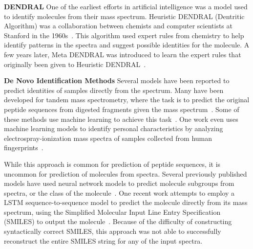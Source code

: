 \textbf{DENDRAL} One of the earliest efforts in artificial intelligence was a model used to identify molecules from their mass spectrum. Heuristic DENDRAL (Dentritic Algorithm) was a collaboration between chemists and computer scientists at Stanford in the 1960s~\cite{buchanan1981dendral}. This algorithm used expert rules from chemistry to help identify patterns in the spectra and suggest possible identities for the molecule. A few years later, Meta DENDRAL was introduced to learn the expert rules that originally been given to Heuristic DENDRAL~\cite{lindsay1993dendral}.

\textbf{De Novo Identification Methods} Several models have been reported to predict identities of samples directly from the spectrum. Many have been developed for tandem mass spectrometry, where the task is to predict the original peptide sequences from digested fragments given the mass spectrum~\cite{Eng1994sequest}. Some of these methods use machine learning to achieve this task~\cite{Tran8247deepnovo, Schoenholtz2018supervision}. One work even uses machine learning models to identify personal characteristics by analyzing electrospray-ionization mass spectra of samples collected from human fingerprints~\cite{Zhou2017LatentFingerprints}.

While this approach is common for prediction of peptide sequences, it is uncommon for prediction of molecules from spectra. Several previously published models have used neural network models to predict molecule subgroups from spectra, or the class of the molecule~\cite{curry1990msnet,spec2smiles}. One recent work attempts to employ a LSTM sequence-to-sequence model to predict the molecule directly from its mass spectrum, using the Simplified Molecular Input Line Entry Specification (SMILES) to output the molecule~\cite{spec2smiles}. Because of the difficulty of constructing syntactically correct SMILES, this approach was not able to successfully reconstruct the entire SMILES string for any of the input spectra.

